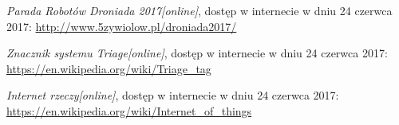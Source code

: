 \begin{thebibliography}{99}
 \emph{Parada Robotów Droniada 2017[online]}, dostęp w internecie w dniu 24 czerwca 2017:
 \url{http://www.5zywiolow.pl/droniada2017/}
 
 \emph{Znacznik systemu Triage[online]}, dostęp w internecie w dniu 24 czerwca 2017:
 \url{https://en.wikipedia.org/wiki/Triage_tag}

 \emph{Internet rzeczy[online]}, dostęp w internecie w dniu 24 czerwca 2017:
 \url{https://en.wikipedia.org/wiki/Internet_of_things}

\end{thebibliography}
